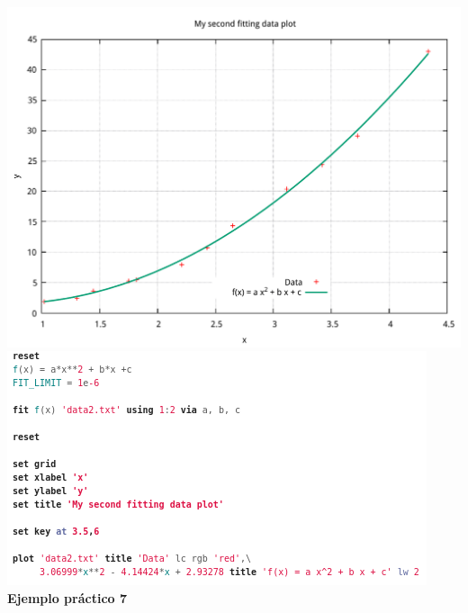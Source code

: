 \documentclass[11.5pt,a4paper]{article}
\begin{document}
\includegraphics[scale=0.40]{ejemplo9.pdf}
\includegraphics[scale=0.55]{screen10.png}\\

\textbf{Ejemplo práctico 7}
\end{document}
